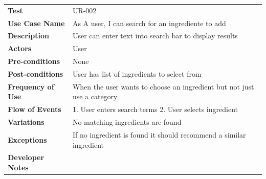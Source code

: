 \documentclass[12pt]{article}
\begin{document}
  \begin{tabular}{ l | l }
    \hline
    \textbf{Test } & UR-002 \\ \rowcolor[gray]{.95}
    \textbf{Use Case Name} & As A user, I can search for an ingrediente to add  \\ 
    \textbf{Description} & User can enter text into search bar to display results \\ \rowcolor[gray]{.95}
    \textbf{Actors} & User \\
    \textbf{Pre-conditions} & None \\ \rowcolor[gray]{.95}
    \textbf{Post-conditions} & User has list of ingredients to select from \\ 
    \textbf{Frequency of Use} & When the user wants to choose an ingredient but not just use a category \\ \rowcolor[gray]{.95}
    \textbf{Flow of Events} & 1. User enters search terms 2. User selects ingredient \\
    \textbf{Variations} & No matching ingredients are found \\  \rowcolor[gray]{.95}
    \textbf{Exceptions} & If no ingredient is found it should recommend a similar ingredient \\
    \textbf{Developer Notes} &  \\ \hline
  \end{tabular}
 
\end{document}
